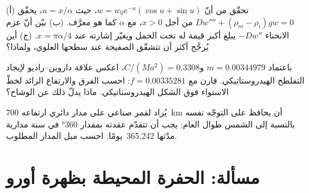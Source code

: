 \begin{exercise}[$\star\star\star$]\label{exo:b3:gravity-geodesy:10}
(أ) تحقّق من أنّ $w = w_0e^{-u}(\cos u + \sin u)$، حيث $u = x/\alpha$، يحقّق
$Dw'''' + (\rho_m - \rho_i)gw = 0$ من أجل $x > 0$، مع $\alpha$ كما هو معرَّف.
(ب) بيّن أنّ عزم الانحناء $-Dw''$ يبلغ أكبر قيمة له تحت الحمل ويغيّر
إشارته عند $x = \pi\alpha/4$. (ج) أين يُرجَّح أكثر أن تتشقّق الصفيحة عند
سطحها العلوي، ولماذا؟
\end{exercise}

\begin{exercise}[$\star\star\star$]\label{exo:b3:gravity-geodesy:11}
باعتماد $m = \num{0.00344979}$ و$C/(Ma^2) = \num{0.3308}$، اعكس
علاقة داروين--راديو لإيجاد التفلطح الهيدروستاتيكي. قارن مع
$f = \num{0.00335281}$: احسب الفرق والارتفاع الزائد لخطّ الاستواء
فوق الشكل الهيدروستاتيكي. ماذا يدلّ ذلك عن الوشاح؟
\end{exercise}

\begin{exercise}[$\star\star\star$]\label{exo:b3:gravity-geodesy:12}
يُراد لقمر صناعي على مدار دائري ارتفاعه \qty{700}{km} أن يحافظ على التوجّه نفسه
بالنسبة إلى الشمس طوال العام: يجب أن تتقدّم عقدته بمقدار \ang{360} في
سنة مدارية مدّتها \num{365.242}~يومًا. احسب ميل المدار المطلوب.
\end{exercise}

\section{مسألة: الحفرة المحيطة بظهرة أورو}

